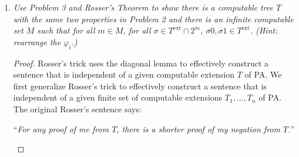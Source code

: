\documentclass{article}
\begin{document}
\begin{enumerate}[label={\bf Q\arabic*:}]
\begin{enumerate}
        \begin{proof}
          We first show that $[T^{\text{ext}}]=[T]$. Clearly
          $[T^{\text{ext}}]\subseteq[T]$. For the reverse inclusion, if
          $f\in[T]$, then all its initial segments must be in
          $[T^{\text{ext}}]$ by definition of $[T^{\text{ext}}]$, thus
          $f\in[T^{\text{ext}}]$. Assume $[T_1]=[T]$. Let $\sigma\in T$ be
          an initial segment that is extended by a path $f$ in $T$. Let
          $n=|\sigma|$. Then since $f\in[T_1]$, $f\restriction
          n=\sigma\in[T_1]$, as required.
        \end{proof}

      \item Prove that $T_{\sigma}$ is infinite if and only if
        $[T_\sigma]\neq\emptyset$.

        \begin{proof}
          Since paths have infinite length, clearly if $T_\sigma$ is
          finite, then $[T_\sigma]=\emptyset$. The forward implication is
          true from Konig's lemma: If $T_\sigma$ is infinite, then we can
          recursively construct a path $f=\cup_{n\in\omega}\tau_n\in
          [T_\sigma]$ by letting $\tau_0=\sigma$, and choosing
          $\tau_{n+1}\succ\tau_n$ to be $\tau_n$ extended with the child
          node whose subtree has infinite nodes.
        \end{proof}
    \end{enumerate}

  \item \it Use Problem 3 and Rosser's Theorem to show there is a
    computable tree $T$ with the same two properties in Problem 2 and there
    is an infinite computable set $M$ such that for all $m\in M$, for all
    $\sigma\in T^{\text{ext}}\cap2^m$, $\sigma0,\sigma1\in T^{\text{ext}}$.
    (Hint: rearrange the $\varphi_i$.)

    \begin{proof}
      Rosser's trick uses the diagonal lemma to effectively construct a
      sentence that is independent of a given computable extension $T$ of
      PA. We first generalize Rosser's trick to effectively construct a
      sentence that is independent of a given finite set of computable
      extensions $T_1,\ldots,T_n$ of PA. The original Rosser's sentence
      says:
      \begin{center}
        ``\textit{For any proof of me from $T$, there is a shorter proof of my
        negation from $T$.}''
      \end{center}


\end{proof}
\end{enumerate}
\end{document}
